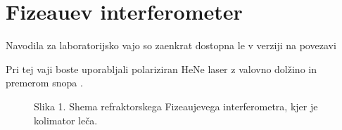 \documentclass[letterpaper,10pt,english]{sphinxmanual}
\begin{document}
\chapter{Fizeauev interferometer}
\label{\detokenize{fizeau:fizeauev-interferometer}}\label{\detokenize{fizeau::doc}}
\sphinxAtStartPar
Navodila za laboratorijsko vajo so zaenkrat dostopna le v  verziji na povezavi 

\sphinxAtStartPar
Pri tej vaji boste uporabljali polariziran He\sphinxhyphen{}Ne laser z valovno dolžino  in premerom snopa .

\begin{figure}[htbp]
\centering
\capstart

\noindent{}
\caption{Slika 1. Shema refraktorskega Fizeau\sphinxhyphen{}jevega interferometra, kjer je kolimator leča.}\label{\detokenize{fizeau:id1}}\end{figure}
\end{document}
